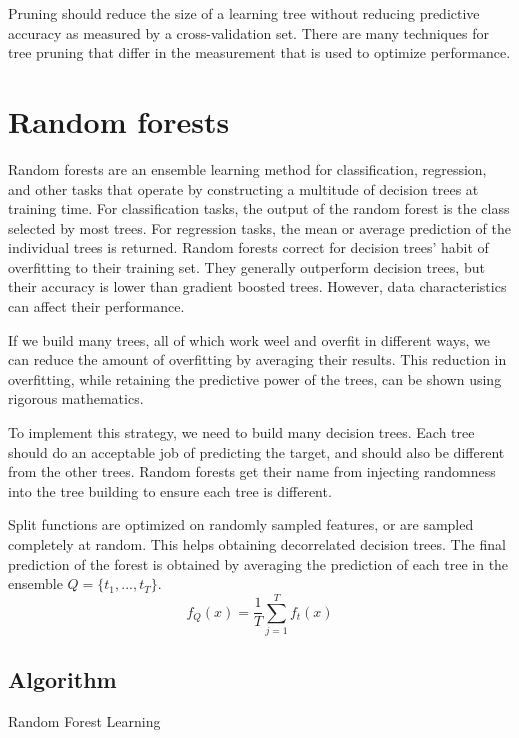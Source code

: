 Pruning should reduce the size of a learning tree without reducing predictive accuracy as measured by a cross-validation set. There are many techniques for tree pruning that differ in the measurement that is used to optimize performance.

\section{Random forests}
Random forests are an ensemble learning method for classification, regression, and other tasks that operate by constructing a multitude of decision trees at training time. For classification tasks, the output of the random forest is the class selected by most trees. For regression tasks, the mean or average prediction of the individual trees is returned. Random forests correct for decision trees' habit of overfitting to their training set. They generally outperform decision trees, but their accuracy is lower than gradient boosted trees. However, data characteristics can affect their performance. 

If we build many trees, all of which work weel and overfit in different ways, we can reduce the amount of overfitting by averaging their results. This reduction in overfitting, while retaining the predictive power of the trees, can be shown using rigorous mathematics.

To implement this strategy, we need to build many decision trees. Each tree should do an acceptable job of predicting the target, and should also be different from the other trees. Random forests get their name from injecting randomness into the tree building to ensure each tree is different.

Split functions are optimized on randomly sampled features, or are sampled completely at random. This helps obtaining decorrelated decision trees. The final prediction of the forest is obtained by averaging the prediction of each tree in the ensemble \(Q = \{t_1,...,t_T\}\).
\begin{equation}
    f_Q(x) = \frac 1 T \sum_{j=1}^T f_t(x)
\end{equation}

\subsection{Algorithm}
\begin{algorithm}
\caption{Random Forest Learning}
\label{alg:perceptron}
\end{algorithm}

